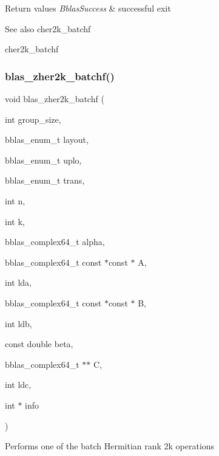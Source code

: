 \begin{DoxyRetVals}{Return values}
{\em Bblas\+Success} & successful exit\\
\hline
\end{DoxyRetVals}
\begin{DoxySeeAlso}{See also}
cher2k\+\_\+batchf 

cher2k\+\_\+batchf 
\end{DoxySeeAlso}
\mbox{\label{group__her2k__batchf_ga809637abe18dd60393b5d0f1baa11dc8}} 
\subsubsection{\texorpdfstring{blas\+\_\+zher2k\+\_\+batchf()}{blas\_zher2k\_batchf()}}
{\footnotesize\ttfamily void blas\+\_\+zher2k\+\_\+batchf (\begin{DoxyParamCaption}\item[{int}]{group\+\_\+size,  }\item[{bblas\+\_\+enum\+\_\+t}]{layout,  }\item[{bblas\+\_\+enum\+\_\+t}]{uplo,  }\item[{bblas\+\_\+enum\+\_\+t}]{trans,  }\item[{int}]{n,  }\item[{int}]{k,  }\item[{bblas\+\_\+complex64\+\_\+t}]{alpha,  }\item[{bblas\+\_\+complex64\+\_\+t const $\ast$const $\ast$}]{A,  }\item[{int}]{lda,  }\item[{bblas\+\_\+complex64\+\_\+t const $\ast$const $\ast$}]{B,  }\item[{int}]{ldb,  }\item[{const double}]{beta,  }\item[{bblas\+\_\+complex64\+\_\+t $\ast$$\ast$}]{C,  }\item[{int}]{ldc,  }\item[{int $\ast$}]{info }\end{DoxyParamCaption})}

Performs one of the batch Hermitian rank 2k operations

